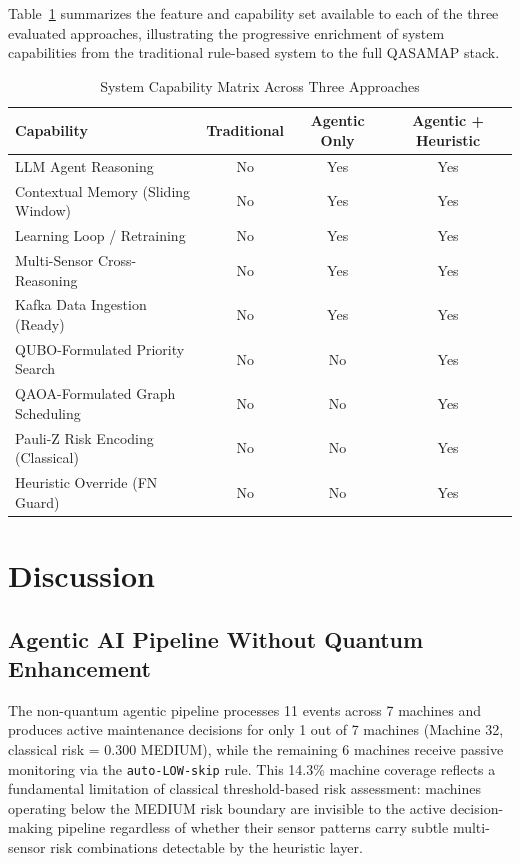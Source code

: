 Table~\ref{tab:cap_mtx} summarizes the feature and capability set available to each of the three evaluated approaches, illustrating the progressive enrichment of system capabilities from the traditional rule-based system to the full QASAMAP stack.
\begin{table}[!htbp]
\centering
\caption{System Capability Matrix Across Three Approaches}
\label{tab:cap_mtx}
\begin{tabular}{lccc}
\hline
\textbf{Capability} & \textbf{Traditional} & \textbf{Agentic Only} & \textbf{Agentic + Heuristic} \\
\hline
LLM Agent Reasoning               & No  & Yes & Yes \\
Contextual Memory (Sliding Window)& No  & Yes & Yes \\
Learning Loop / Retraining        & No  & Yes & Yes \\
Multi-Sensor Cross-Reasoning      & No  & Yes & Yes \\
Kafka Data Ingestion (Ready)      & No  & Yes & Yes \\
QUBO-Formulated Priority Search   & No  & No  & Yes \\
QAOA-Formulated Graph Scheduling  & No  & No  & Yes \\
Pauli-Z Risk Encoding (Classical) & No  & No  & Yes \\
Heuristic Override (FN Guard)     & No  & No  & Yes \\
\hline
\end{tabular}
\end{table}
\section{Discussion}

\subsection{Agentic AI Pipeline Without Quantum Enhancement}

The non-quantum agentic pipeline processes 11 events across 7 machines and produces active maintenance decisions for only 1 out of 7 machines (Machine 32, classical risk = 0.300 MEDIUM), while the remaining 6 machines receive passive monitoring via the \texttt{auto-LOW-skip} rule. This 14.3\% machine coverage reflects a fundamental limitation of classical threshold-based risk assessment: machines operating below the MEDIUM risk boundary are invisible to the active decision-making pipeline regardless of whether their sensor patterns carry subtle multi-sensor risk combinations detectable by the heuristic layer.


